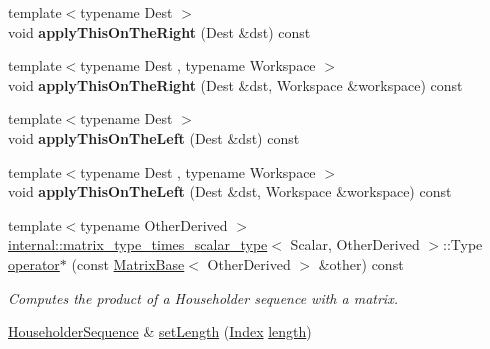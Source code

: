 \begin{DoxyCompactItemize}
\item 
\mbox{\label{group___householder___module_a7ee4190e14c5e76a9680551c40db0a7d}} 
{\footnotesize template$<$typename Dest $>$ }\\void {\bfseries apply\+This\+On\+The\+Right} (Dest \&dst) const
\item 
\mbox{\label{group___householder___module_afc99539a130da4395c7df7d1ef1f43f3}} 
{\footnotesize template$<$typename Dest , typename Workspace $>$ }\\void {\bfseries apply\+This\+On\+The\+Right} (Dest \&dst, Workspace \&workspace) const
\item 
\mbox{\label{group___householder___module_a8bdafe8c85f1a4f76a983db1cfb87099}} 
{\footnotesize template$<$typename Dest $>$ }\\void {\bfseries apply\+This\+On\+The\+Left} (Dest \&dst) const
\item 
\mbox{\label{group___householder___module_a692c1997dc2acda1f4b282faf9432cd3}} 
{\footnotesize template$<$typename Dest , typename Workspace $>$ }\\void {\bfseries apply\+This\+On\+The\+Left} (Dest \&dst, Workspace \&workspace) const
\item 
{\footnotesize template$<$typename Other\+Derived $>$ }\\\hyperlink{struct_eigen_1_1internal_1_1matrix__type__times__scalar__type}{internal\+::matrix\+\_\+type\+\_\+times\+\_\+scalar\+\_\+type}$<$ Scalar, Other\+Derived $>$\+::Type \hyperlink{group___householder___module_ac57e5a22f1646e04a4f8b4cba3825928}{operator$\ast$} (const \hyperlink{group___core___module_class_eigen_1_1_matrix_base}{Matrix\+Base}$<$ Other\+Derived $>$ \&other) const
\begin{DoxyCompactList}\small\item\em Computes the product of a Householder sequence with a matrix. \end{DoxyCompactList}\item 
\hyperlink{group___householder___module_class_eigen_1_1_householder_sequence}{Householder\+Sequence} \& \hyperlink{group___householder___module_a30cc06d5b2ca4b7dcf5fcd53313d25fc}{set\+Length} (\hyperlink{group___core___module_a554f30542cc2316add4b1ea0a492ff02}{Index} \hyperlink{group___householder___module_ac62fad812f3893f237378fe70e55bf66}{length})

\end{DoxyCompactItemize}
